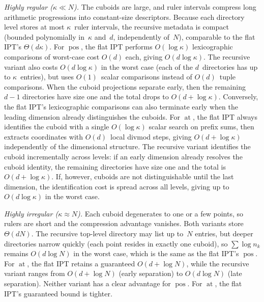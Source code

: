 \documentclass[manuscript,screen,review]{acmart}
\theoremstyle{definition}
\theoremstyle{plain}
\begin{document}
\emph{Highly regular ($\kappa\ll N$).}
The cuboids are large, and ruler intervals compress long arithmetic
progressions into constant-size descriptors.
Because each directory level stores at most $\kappa$~ruler intervals,
the recursive metadata is compact (bounded polynomially
in~$\kappa$ and~$d$, independently of~$N$), comparable
to the flat IPT's $\Theta(d\kappa)$.
For $\operatorname{pos}$, the flat IPT performs $O(\log\kappa)$ lexicographic
comparisons of worst-case cost $O(d)$ each, giving $O(d\log\kappa)$.
The recursive variant also costs $O(d\log\kappa)$ in the worst case
(each of the $d$~directories has up to $\kappa$~entries),
but uses $O(1)$~scalar comparisons instead of $O(d)$~tuple comparisons.
When the cuboid projections separate early, then the remaining $d{-}1$ directories
have size one and the total drops to $O(d+\log\kappa)$.
Conversely, the flat IPT's lexicographic comparisons can also
terminate early when the leading dimension already distinguishes
the cuboids.
For $\operatorname{at}$, the flat IPT always identifies the cuboid with
a single $O(\log\kappa)$ scalar search on prefix sums,
then extracts coordinates with $O(d)$~local divmod steps,
giving $O(d+\log\kappa)$ independently of the dimensional structure.
The recursive variant identifies the cuboid incrementally
across levels:
if an early dimension already resolves the cuboid identity,
the remaining directories have size one and the total is
$O(d+\log\kappa)$.
If, however, cuboids are not distinguishable until the last
dimension, the identification cost is spread across all levels,
giving up to $O(d\log\kappa)$ in the worst case.

\emph{Highly irregular ($\kappa\approx N$).}
Each cuboid degenerates to one or a few points, so rulers are short
and the compression advantage vanishes.
Both variants store $\Theta(dN)$.
The recursive top-level directory may list up to~$N$ entries, but deeper directories narrow quickly
(each point resides in exactly one cuboid),
so $\sum\log n_k$ remains $O(d\log N)$ in the worst case, which is the
same as the flat IPT's $\operatorname{pos}$.
For $\operatorname{at}$, the flat IPT retains a guaranteed $O(d+\log N)$,
while the recursive variant ranges from $O(d+\log N)$
(early separation) to $O(d\log N)$ (late separation).
Neither variant has a clear advantage for $\operatorname{pos}$.
For $\operatorname{at}$, the flat IPT's guaranteed bound is tighter.
\end{document}
